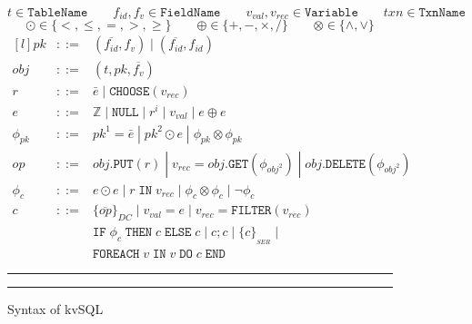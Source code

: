 \begin{figure}[h]
        $$
        t \in \texttt{TableName} \qquad 
        f_{id},f_v \in \texttt{FieldName} \qquad 
        v_{val},v_{rec} \in \texttt{Variable} \qquad
        txn \in \texttt{TxnName}
        $$
        \vspace{-6mm} %
        $$ \odot \in \{<,\leq,=,>,\geq\} \qquad 
        \oplus \in \{+,-,\times,/ \} \qquad 
        \otimes \in \{\wedge, \vee\}
        $$ 
        $$
        \begin{matrix*}[l]
                pk & ::= & (\overline{f_{id}},f_v)\;|\;(\overline{f_{id}},f_{id})\\
                obj &  ::= & (t,pk,\overline{f_v}) \\
                r &  ::= & \bar{e}\;|\; \texttt{CHOOSE}(v_{rec}) \\
                e &  ::= & \mathbb{Z} \;|\; \texttt{NULL} \;|\; r^i \;|\; v_{val} \;|\; e \oplus e \\
                \phi_{pk}  & ::= & pk^{1} = \bar{e} \;|\; pk^{2} \odot e
                \;|\; \phi_{pk} \otimes \phi_{pk} \\
                op   & ::= & obj.\texttt{PUT}(r) \;|\; 
                v_{rec} = obj.\texttt{GET}(\phi_{obj^{2}}) \;|\;  obj.\texttt{DELETE}(\phi_{obj^{2}})  \\
                \phi_{c}  & ::= & e\odot e \;|\;  r\;\texttt{IN} \; v_{rec} \;|\; \phi_{c} 
                \otimes \phi_{c} \;|\; \neg \phi_{c} \\
                c   & ::=  & \{\overline{op}\}_{DC}
                \;|\; v_{val} = e \;|\; v_{rec} = \texttt{FILTER} (v_{rec})
                \\  & & \texttt{IF}\; \phi_c \;\texttt{THEN} \;c \;\texttt{ELSE}\; c \;|\;  c;c \;|\;
                \{c\}_{_{SER}} \;|\;
                \\  & & \texttt{FOREACH}\; v \;\texttt{IN} \; v \; \texttt{DO}\; c \;\texttt{END}
                
        \end{matrix*}
        $$
        \hrule \hrule
\caption{Syntax of kvSQL}
\label{fig:syn}
\end{figure}
